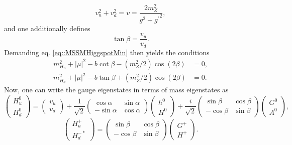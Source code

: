 \documentclass[a4paper,12pt]{book}
\begin{document}
\begin{equation}
v_u^2+v_d^2 = v = \frac{2m_Z^2}{g^2+{g^\prime}^2},
\end{equation}
and one additionally defines 
\begin{equation}
\tan\beta = \frac{v_u}{v_d}.
\end{equation} 
Demanding eq. \eqref{eq::MSSMHiggspotMin} then yields the conditions
\begin{align}
m_{H_u}^2 + |\mu |^2 -b \cot\beta - (m_Z^2/2) \cos (2\beta) &= 0,\\
m_{H_d}^2 + |\mu |^2 -b \tan\beta + (m_Z^2/2) \cos (2\beta) &= 0.
\end{align}
Now, one can write the gauge eigenstates in terms of mass eigenstates as \cite{martinSUSY}
\begin{equation}
\begin{pmatrix}
H_u^0\\
H_d^0
\end{pmatrix} =
\begin{pmatrix}
v_u\\
v_d
\end{pmatrix} + 
\frac{1}{\sqrt{2}} \begin{pmatrix}
\cos \alpha& \sin \alpha\\
-\sin \alpha& \cos \alpha
\end{pmatrix} \begin{pmatrix}
h^0\\
H^0
\end{pmatrix}+ 
\frac{i}{\sqrt{2}} \begin{pmatrix}
\sin \beta& \cos \beta\\
-\cos \beta& \sin \beta
\end{pmatrix} \begin{pmatrix}
G^0\\
A^0
\end{pmatrix},
\end{equation}
\begin{equation}
\begin{pmatrix}
H_u^+\\
H_d^{-*}
\end{pmatrix} =
\begin{pmatrix}
\sin \beta& \cos \beta\\
-\cos \beta& \sin \beta
\end{pmatrix} \begin{pmatrix}
G^+\\
H^+
\end{pmatrix}.
\end{equation}
\end{document}
